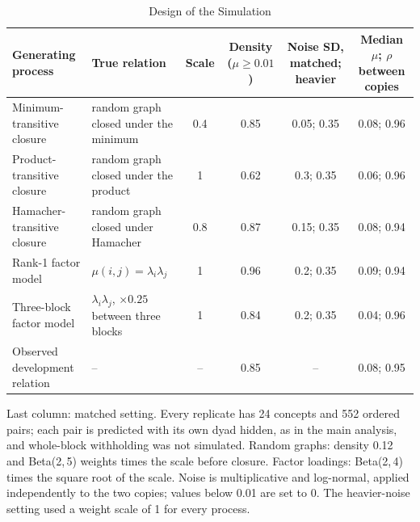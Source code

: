 \documentclass[journal]{IEEEtran}
\begin{document}
\setcounter{table}{12}\begin{table}[!t]
\caption{Design of the Simulation}
\centering
\scriptsize
\begin{tabular}{@{}l l c c c c@{}}
\toprule
Generating process & True relation & Scale & Density ($\mu\ge0.01$) & Noise SD, matched; heavier & Median $\mu$; $\rho$ between copies\\
\midrule
Minimum-transitive closure & random graph closed under the minimum & 0.4 & 0.85 & 0.05; 0.35 & 0.08; 0.96\\
Product-transitive closure & random graph closed under the product & 1 & 0.62 & 0.3; 0.35 & 0.06; 0.96\\
Hamacher-transitive closure & random graph closed under Hamacher & 0.8 & 0.87 & 0.15; 0.35 & 0.08; 0.94\\
Rank-1 factor model & $\mu(i,j)=\lambda_i\lambda_j$ & 1 & 0.96 & 0.2; 0.35 & 0.09; 0.94\\
Three-block factor model & $\lambda_i\lambda_j$, $\times0.25$ between three blocks & 1 & 0.84 & 0.2; 0.35 & 0.04; 0.96\\
Observed development relation & -- & -- & 0.85 & -- & 0.08; 0.95\\
\bottomrule
\end{tabular}

\smallskip
\parbox{\textwidth}{\scriptsize Last column: matched setting. Every replicate has 24 concepts and 552 ordered pairs; each pair is predicted with its own dyad hidden, as in the main analysis, and whole-block withholding was not simulated. Random graphs: density 0.12 and Beta(2,\,5) weights times the scale before closure. Factor loadings: Beta(2,\,4) times the square root of the scale. Noise is multiplicative and log-normal, applied independently to the two copies; values below 0.01 are set to 0. The heavier-noise setting used a weight scale of 1 for every process.}
\end{table}
\end{document}
